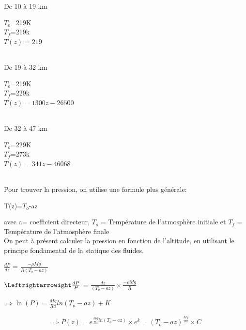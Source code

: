 \documentclass[a4paper, 12pt]{report} %
\begin{document}
De 10 à 19 km \\
\begin{center}
    $T_o$=219K\\
    $T_f$=219k\\
    $T(z)=219$
\end{center}\\

De 19 à 32 km \\
\begin{center}
    $T_o$=219K\\
    $T_f$=229k\\
    $T(z)=1300z-26500$
\end{center}\\

De 32 à 47 km \\
\begin{center}
    $T_o$=229K\\
    $T_f$=273k\\
    $T(z)=341z-46068$
\end{center}\\

Pour trouver la pression, on utilise une formule plus générale:\\
\begin{center}
T(z)=$T_o$-az      
\end{center}
avec a= coefficient directeur, $T_o$ = Température de l'atmosphère initiale et $T_f$ = Température de l'atmosphère finale \\

On peut à présent calculer la pression en fonction de l'altitude, en utilisant le principe fondamental de la statique des fluides. 
\begin{center}
     $\frac{dP}{dz}$ = $\frac{-\rho Mg}{R(T_o-az)}$ \\
\end{center}

\begin{center}
     $\Leftrightarrowight\frac{dP}{P}$ = $\frac{dz }{(T_o-az)} \times \frac{-\rho Mg}{R}$\\
\end{center}

\begin{center}
     $\Rightarrow \ln(P)=\frac{Mg}{Ra} ln(T_o-az)+K$\\
\end{center}

\begin{align*}
     \Rightarrow P(z) = e^{\frac{Mg}{Ra}ln(T_o-az)} \times e^k =(T_o -az)^{\frac{Mg}{Ra}} \times C
\end{align*}
\end{document}
